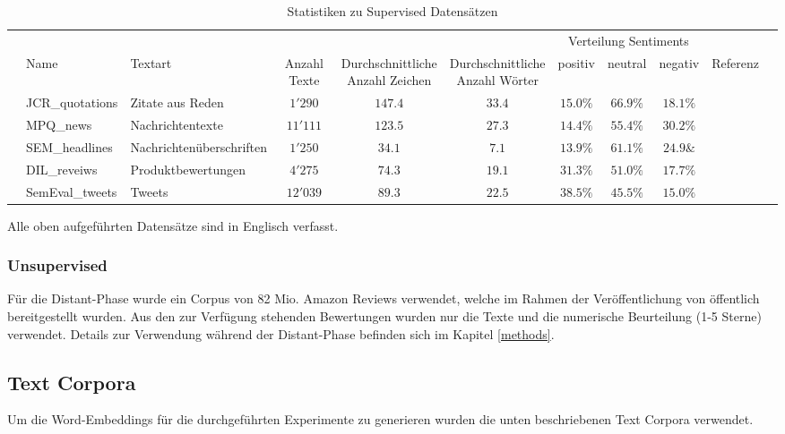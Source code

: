 \begin{table}[h]
	\begin{adjustbox}{max width=\textwidth}
		\begin{tabular}{@{}lllcccccccl@{}}
			\toprule
			& & & & & & \multicolumn{3}{c}{Verteilung Sentiments} &\\
			\cmidrule(r){7-9}
			& Name & Textart & Anzahl Texte & \specialcell{Durchschnittliche\\Anzahl Zeichen} & \specialcell{Durchschnittliche\\Anzahl Wörter} & positiv & neutral & negativ & Referenz &\\ \midrule
			& JCR{\_}quotations & Zitate aus Reden & $1'290$ & $147.4$ & $33.4$ & $15.0\%$ & $66.9\%$ & $18.1\%$ & \cite{cieliebak2013potential}\\
			& MPQ{\_}news & Nachrichtentexte & $11'111$ & $123.5$ & $27.3$ & $14.4\%$ & $55.4\%$ & $30.2\%$ & \cite{cieliebak2013potential}\\
			& SEM{\_}headlines & Nachrichtenüberschriften & $1'250$ & $34.1$ & $7.1$ & $13.9\%$ & $61.1\%$ & $24.9\&$ & \cite{cieliebak2013potential}\\
			& DIL{\_}reveiws & Produktbewertungen & $4'275$ & $74.3$ & $19.1$ & $31.3\%$ & $51.0\%$ & $17.7\%$ & \cite{cieliebak2013potential}\\
			& SemEval{\_}tweets & Tweets & $12'039$ & $89.3$ & $22.5$ & $38.5\%$ & $45.5\%$ & $15.0\%$ & \cite{SemEval:2016:task4}\\
			\bottomrule
		\end{tabular}
	\end{adjustbox}
	\caption{Statistiken zu Supervised Datensätzen}
\end{table}

Alle oben aufgeführten Datensätze sind in Englisch verfasst.

\subsubsection{Unsupervised}
Für die Distant-Phase wurde ein Corpus von 82 Mio. Amazon Reviews verwendet, welche im Rahmen der Veröffentlichung von \cite{zhang2015character} öffentlich bereitgestellt wurden. Aus den zur Verfügung stehenden Bewertungen wurden nur die Texte und die numerische Beurteilung (1-5 Sterne) verwendet. Details zur Verwendung während der Distant-Phase befinden sich im Kapitel \ref{methods}.

\subsection{Text Corpora}
Um die Word-Embeddings für die durchgeführten Experimente zu generieren wurden die unten beschriebenen Text Corpora verwendet.

